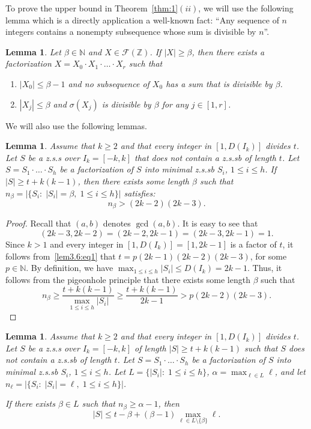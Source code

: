\documentclass[12 pt]{amsart}
\newtheorem{lemma}[theorem]{Lemma}
\def \bs{\bigskip}
\def \F{\mathcal F}
\def \Z{\mathbb Z}
\def \N{\mathbb N}
\def \Z{\mathbb Z}
\def \zs{z.s.s }
\def \zsb{z.s.s{\tiny b} }
\begin{document}
\bs To prove the upper bound in Theorem~\ref{thm:1}$(ii)$, we will use the following lemma which is a directly application 
a well-known fact: ``Any sequence of $n$ integers contains a nonempty subsequence whose sum is divisible by $n$''.
%
\begin{lemma}\label{lem:3.5}
Let $\beta\in\N$ and $X\in\F(\Z)$. If $|X|\geq \beta$, then there exists a factorization 
$X=X_0\cdot X_1\cdot\ldots\cdot X_r$ such that 
\begin{enumerate}
\item[(i)]  $|X_0|\leq \beta-1$ and no subsequence of $X_0$ 
has a sum that is divisible by $\beta$.
\item[(ii)] $|X_j|\leq \beta$ and  $\sigma(X_j)$ is divisible by $\beta$ for any $j\in[1,r]$.
\end{enumerate}
\end{lemma}
%
We will also use the following lemmas.
%
\begin{lemma}\label{lem:3.6}
Assume that $k\geq2$ and that every integer in $[1,D(I_k)]$ divides $t$. Let $S$ be a \zs over $I_k=[-k,k]$ that does not contain a \zsb of length $t$.  Let $S=S_1\cdot\ldots\cdot S_h$  
be a factorization of $S$ into minimal \zsb $S_i$, $1\leq i\leq h$. If $|S|\geq  t+k(k-1)$, then there exists some length $\beta$ such that 
$n_\beta=|\{S_i:\; |S_i|=\beta,\; 1\leq i\leq h\}|$ satisfies:
\[n_\beta> (2k-2)(2k-3).\]
\end{lemma}
%
\begin{proof}
Recall that $(a,b)$ denotes $\gcd(a,b)$. It is easy 
to see that 
\begin{equation}\label{lem3.6:eq1}
(2k-3,2k-2)=(2k-2,2k-1)=(2k-3,2k-1)=1.
\end{equation}
Since $k>1$ and every integer in $[1,D(I_k)]=[1,2k-1]$ is a factor of $t$, it follows from~\eqref{lem3.6:eq1}  
that $t=p(2k-1)(2k-2)(2k-3)$, for some $p\in\N$.  
By definition, we have $\max_{1\leq i\leq h}|S_i|\leq D(I_k)=2k-1$. Thus, it follows from the pigeonhole principle that there exists some length $\beta$ such that
\[n_\beta\geq\frac{t+k(k-1)}{\max\limits_{1\leq i\leq h}|S_i|}\geq \frac{t+k(k-1)}{2k-1}>p(2k-2)(2k-3).\]
\end{proof}
%
\begin{lemma}\label{lem:3.7}
Assume that $k\geq2$ and that every integer in $[1,D(I_k)]$ divides $t$. Let $S$ be a \zs over $I_k=[-k,k]$ of 
length $|S|\geq t+k(k-1)$ such that $S$ does not contain a \zsb of length $t$. Let $S=S_1\cdot\ldots\cdot S_h$  
be a factorization of $S$ into minimal \zsb $S_i$, $1\leq i\leq h$. Let $L=\{|S_i|:\; 1\leq i\leq h\}$, $\alpha=\max_{\ell\in L}\ell$, and let $n_\ell=|\{S_i:\; |S_i|=\ell,\; 1\leq i\leq h\}|$.

If there exists $\beta\in L$ such that $n_\beta\geq \alpha-1$, then 
\[|S|\leq t-\beta+(\beta-1)\max_{\ell\in L\setminus\{\beta\}}\ell.\]
\end{lemma}
\end{document}

